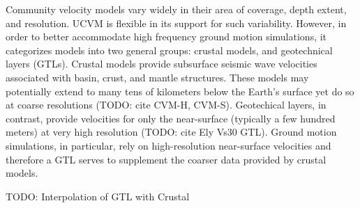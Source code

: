 Community velocity models vary widely in their area of coverage, depth extent, and resolution. UCVM is flexible in its support for such variability. However, in order to better accommodate high frequency ground motion simulations, it categorizes models into two general groups: crustal models, and geotechnical layers (GTLs). Crustal models provide subsurface seismic wave velocities associated with basin, crust, and mantle structures. These models may potentially extend to many tens of kilometers below the Earth's surface yet do so at coarse resolutions (TODO: cite CVM-H, CVM-S). Geotechical layers, in contrast, provide velocities for only the near-surface (typically a few hundred meters) at very high resolution (TODO: cite Ely Vs30 GTL). Ground motion simulations, in particular, rely on high-resolution near-surface velocities and therefore a GTL serves to supplement the coarser data provided by crustal models.

TODO: Interpolation of GTL with Crustal